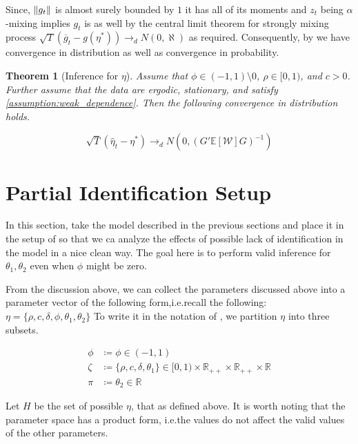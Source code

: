 \documentclass[11pt]{article}
\newtheorem{Theorem}{Theorem}[section]
\newcommand*{\R}{\mathbb{R}}
\newcommand*{\W}{\mathcal{W}}
\newcommand*{\E}{\mathbb{E}}
\newcommand*{\N}{N}
\newcommand*{\dto}{\ensuremath{\to_d}}
\newcommand*{\Eta}{H}
\newcommand*{\popmom}{\ensuremath{g}}
\newcommand*{\sampmom}{\ensuremath{\overline{g}_t}}
\DeclarePairedDelimiter\norm{\lVert}{\rVert}
\begin{document}
Since, $\norm*{g_t}$ is almost surely bounded by $1$ it has all of its moments and $z_t$ being $\alpha$-mixing
implies $g_t$ is as well by the central limit theorem for strongly mixing process 
$\sqrt{T} \left(\sampmom - \popmom(\eta^{*})\right) \dto \N(0, \aleph)$ as required. 
Consequently, by \textcite[Theorem 3.2]{newey1994large} we have convergence in distribution as well as convergence
in probability.

\begin{Theorem}[Inference for $\eta$]
    Assume that $\phi  \in (-1,1) \setminus 0$, $\rho \in [0,1)$, and $c > 0$. 
    Further assume that the data are ergodic, stationary, and satisfy \cref{assumption:weak_dependence}.
    Then the following convergence in distribution holds.

    \begin{equation}
    \sqrt{T} (\widehat{\eta}_t - \eta^{*}) \dto \N\left(0, \left(G' \E[\W] G\right)^{-1}\right)
    \end{equation}
\end{Theorem}


\section{Partial Identification Setup}

In this section, take the model described in the previous sections and place it in the setup of
\textcite{andrewsGmm2014} so that we ca analyze the effects of possible lack of identification in the model in a
nice clean way.
The goal here is to perform valid inference for $\theta_1, \theta_2$ even when $\phi$ might be zero. 


From the discussion above, we can collect the parameters discussed above into a parameter vector of the following
form,i.e.\@ recall the following: $\eta = \lbrace \rho, c, \delta, \phi, \theta_1, \theta_2 \rbrace$
To write it in the notation of \textcite{andrewsGmm2014}, we partition $\eta$ into three subsets.

\begin{align}
    \phi &\coloneqq \phi  \in (-1, 1) \\ 
    \zeta &\coloneqq \lbrace \rho, c, \delta, \theta_1 \rbrace \in [0,1) \times \R_{++} \times \R_{++} \times
    \R  \\
    \pi &\coloneqq \theta_2 \in \R 
\end{align}

Let $\Eta$ be the set of possible $\eta$, that as defined above.
It is worth noting that the parameter space has a product form, i.e.\@ the values do not affect the valid values
of the other parameters.
\end{document}
